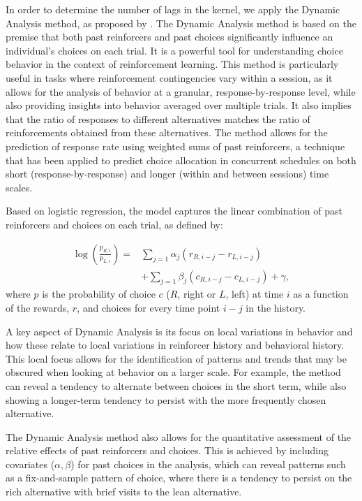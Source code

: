 \documentclass[
  number,
  preprint,
  3p,
  onecolumn]{elsarticle}
\begin{document}
In order to determine the number of lags in the kernel, we apply the
Dynamic Analysis method, as proposed by \citep{lau2005}. The Dynamic
Analysis method is based on the premise that both past reinforcers and
past choices significantly influence an individual's choices on each
trial. It is a powerful tool for understanding choice behavior in the
context of reinforcement learning. This method is particularly useful in
tasks where reinforcement contingencies vary within a session, as it
allows for the analysis of behavior at a granular, response-by-response
level, while also providing insights into behavior averaged over
multiple trials. It also implies that the ratio of responses to
different alternatives matches the ratio of reinforcements obtained from
these alternatives. The method allows for the prediction of response
rate using weighted sums of past reinforcers, a technique that has been
applied to predict choice allocation in concurrent schedules on both
short (response-by-response) and longer (within and between sessions)
time scales.

Based on logistic regression, the model captures the linear combination
of past reinforcers and choices on each trial, as defined by:

\[
\begin{aligned}\log \left(\frac{p_{R, i}}{p_{L, i}}\right)= & \sum_{j=1} \alpha_{ j}( r_{R, i-j}-r_{L, i-j}) \\& +\sum_{j=1} \beta_{j} (c_{R, i-j}-c_{L, i-j})+\gamma,\end{aligned}
\] where \(p\) is the probability of choice \(c\) (\(R\), right or
\(L\), left) at time \(i\) as a function of the rewards, \(r\), and
choices for every time point \(i-j\) in the history.

A key aspect of Dynamic Analysis is its focus on local variations in
behavior and how these relate to local variations in reinforcer history
and behavioral history. This local focus allows for the identification
of patterns and trends that may be obscured when looking at behavior on
a larger scale. For example, the method can reveal a tendency to
alternate between choices in the short term, while also showing a
longer-term tendency to persist with the more frequently chosen
alternative.

The Dynamic Analysis method also allows for the quantitative assessment
of the relative effects of past reinforcers and choices. This is
achieved by including covariates (\(\alpha, \beta\)) for past choices in
the analysis, which can reveal patterns such as a fix-and-sample pattern
of choice, where there is a tendency to persist on the rich alternative
with brief visits to the lean alternative.
\end{document}
